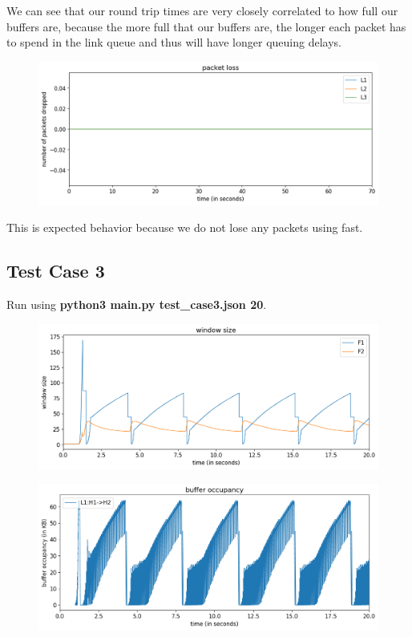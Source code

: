 \documentclass{article}
\begin{document}
We can see that our round trip times are very closely correlated to how full our buffers are, because the more full that our buffers are, the longer each packet has to spend in the link queue and thus will have longer queuing delays.

\begin{figure}[H]
\centering
\includegraphics[width = \textwidth]{test_case2_fast packet loss.png}
\end{figure}

This is expected behavior because we do not lose any packets using fast.



\subsection{Test Case 3} 

Run using \textbf{python3 main.py test\_case3.json 20}.

\begin{figure}[H]
\centering
\includegraphics[width = \textwidth]{test_case3 window size.png}
\end{figure}

\begin{figure}[H]
\centering
\includegraphics[width = \textwidth]{test_case3 buffer occupancy.png}
\end{figure}
\end{document}
